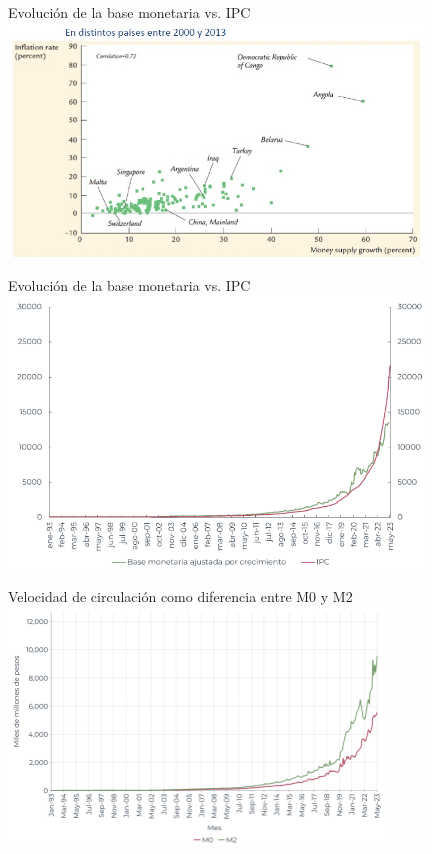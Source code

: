 \documentclass{beamer}
\begin{document}
\begin{frame}{Evolución de la base monetaria vs. IPC}
\centering\includegraphics[width=11cm]{../Figures/C33.4.jpg}\
\end{frame}

\begin{frame}{Evolución de la base monetaria vs. IPC}
    \centering
    \includegraphics[width=11cm]{../Figures/C38.7.png}\
\end{frame}


\begin{frame}{Velocidad de circulación como diferencia entre M0 y M2}
\centering\includegraphics[width=10cm]{../Figures/C38.8.png}\
\end{frame}
\end{document}
